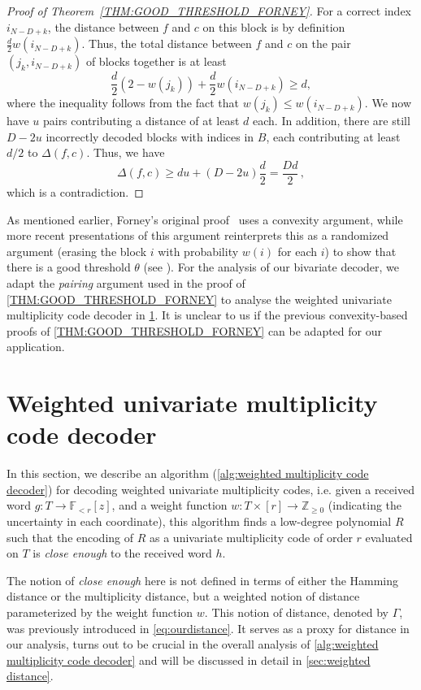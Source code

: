 \documentclass{theoretics}
\def\Integer{\mathbb{Z}}
\def\Field{\mathbb{F}}
\let\Z\Integer
\let\F\Field
\newcommand{\Del}{\Delta}
\begin{document}
\begin{proof}[Proof of Theorem~\ref{THM:GOOD_THRESHOLD_FORNEY}]
		For a correct index $i_{N-D +k}$, the distance between $f$ and $c$ on
		this block is by definition $\frac{d}{2}w(i_{N-D+k})$. Thus, the total distance between $f$ and $c$ on the pair $(j_k, i_{N-D+k})$ of blocks together is at least 
		\[
		\frac{d}{2}(2-w(j_k)) + \frac{d}{2}w(i_{N-D+k}) \geq d,
		\]
		where the inequality follows from the fact that $w(j_k) \leq w(i_{N-D+k})$. We now have $u$ pairs contributing a distance of at least $d$ each. In addition, there are still $D-2u$ incorrectly decoded blocks with indices in $B$, each contributing at least $d/2$ to $\Delta(f,c)$. Thus, we have
		\[ 
		\Del(f,c) \geq du + (D-2u)\frac{d}{2}  = \frac{Dd}{2} \, ,
		\]
		which is a contradiction.
	\end{proof}
	
	As mentioned earlier, Forney's original proof~\cite{Forney1965,
		Forney1966} uses a convexity argument, while more recent
	presentations of this argument reinterprets this as a randomized
	argument (erasing the block $i$ with probability $w(i)$ for each $i$)
	to show that there is a good threshold $\theta$ (see
	\cite[Section~12.3]{GuruswamiRS}). For the analysis of our bivariate decoder,
	we adapt the \emph{pairing} argument used in the proof of
	\cref{THM:GOOD_THRESHOLD_FORNEY} to analyse the weighted univariate
	multiplicity code decoder in \cref{sec:wumd}. It is unclear to us if the previous
	convexity-based proofs of  \cref{THM:GOOD_THRESHOLD_FORNEY} can be
	adapted for our application.
	
	\section{Weighted univariate multiplicity code decoder}\label{sec:wumd}
	
	In this section, we describe an algorithm (\cref{alg:weighted multiplicity code decoder}) for decoding weighted
	univariate multiplicity codes, i.e. given a received word $g\colon T
	\to \F_{<r}[z]$, and a weight function $w\colon  T\times [r]\to
	\Z_{\geq 0}$ (indicating the uncertainty in each coordinate), this algorithm finds a low-degree polynomial $R$ such
	that the encoding of $R$ as a univariate multiplicity code of order
	$r$ evaluated on $T$ is \emph{close enough} to the received word
	$h$. 
	
	The notion of \emph{close enough} here is not defined in
	terms of either the Hamming distance or the multiplicity distance, but a weighted notion of distance parameterized by the weight function $w$. This notion of distance, denoted by $\Gamma$, was previously introduced in \cref{eq:ourdistance}.
	It serves as a proxy for distance in our analysis, turns out to be
	crucial in the overall analysis of \cref{alg:weighted multiplicity code decoder} and will be discussed in detail in \cref{sec:weighted distance}. 
	
\end{document}
